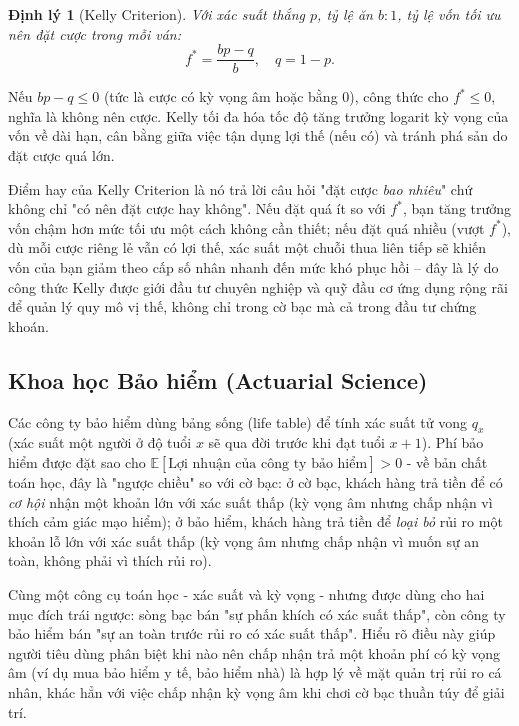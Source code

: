 \documentclass[12pt,a4paper]{article}
\theoremstyle{coloredthm}
\newtheorem{theorem}{Định lý}[section]
\theoremstyle{coloreddef}
\theoremstyle{remark}
\begin{document}
\begin{theorem}[Kelly Criterion]
Với xác suất thắng $p$, tỷ lệ ăn $b:1$, tỷ lệ vốn tối ưu nên đặt cược trong mỗi ván:
\[
f^* = \frac{bp - q}{b}, \quad q = 1 - p.
\]
\end{theorem}

Nếu $bp - q \le 0$ (tức là cược có kỳ vọng âm hoặc bằng $0$), công thức cho $f^* \le 0$, nghĩa là không nên cược. Kelly tối đa hóa tốc độ tăng trưởng logarit kỳ vọng của vốn về dài hạn, cân bằng giữa việc tận dụng lợi thế (nếu có) và tránh phá sản do đặt cược quá lớn.

\begin{giaithich}
Điểm hay của Kelly Criterion là nó trả lời câu hỏi "đặt cược \emph{bao nhiêu}" chứ không chỉ "có nên đặt cược hay không". Nếu đặt quá ít so với $f^*$, bạn tăng trưởng vốn chậm hơn mức tối ưu một cách không cần thiết; nếu đặt quá nhiều (vượt $f^*$), dù mỗi cược riêng lẻ vẫn có lợi thế, xác suất một chuỗi thua liên tiếp sẽ khiến vốn của bạn giảm theo cấp số nhân nhanh đến mức khó phục hồi -- đây là lý do công thức Kelly được giới đầu tư chuyên nghiệp và quỹ đầu cơ ứng dụng rộng rãi để quản lý quy mô vị thế, không chỉ trong cờ bạc mà cả trong đầu tư chứng khoán.
\end{giaithich}

\subsection{Khoa học Bảo hiểm (Actuarial Science)}

Các công ty bảo hiểm dùng bảng sống (life table) để tính xác suất tử vong $q_x$ (xác suất một người ở độ tuổi $x$ sẽ qua đời trước khi đạt tuổi $x+1$). Phí bảo hiểm được đặt sao cho $\mathbb{E}[\text{Lợi nhuận của công ty bảo hiểm}] > 0$ - về bản chất toán học, đây là "ngược chiều" so với cờ bạc: ở cờ bạc, khách hàng trả tiền để có \emph{cơ hội} nhận một khoản lớn với xác suất thấp (kỳ vọng âm nhưng chấp nhận vì thích cảm giác mạo hiểm); ở bảo hiểm, khách hàng trả tiền để \emph{loại bỏ} rủi ro một khoản lỗ lớn với xác suất thấp (kỳ vọng âm nhưng chấp nhận vì muốn sự an toàn, không phải vì thích rủi ro).

\begin{ungdung}
Cùng một công cụ toán học - xác suất và kỳ vọng - nhưng được dùng cho hai mục đích trái ngược: sòng bạc bán "sự phấn khích có xác suất thấp", còn công ty bảo hiểm bán "sự an toàn trước rủi ro có xác suất thấp". Hiểu rõ điều này giúp người tiêu dùng phân biệt khi nào nên chấp nhận trả một khoản phí có kỳ vọng âm (ví dụ mua bảo hiểm y tế, bảo hiểm nhà) là hợp lý về mặt quản trị rủi ro cá nhân, khác hẳn với việc chấp nhận kỳ vọng âm khi chơi cờ bạc thuần túy để giải trí.
\end{ungdung}
\end{document}
